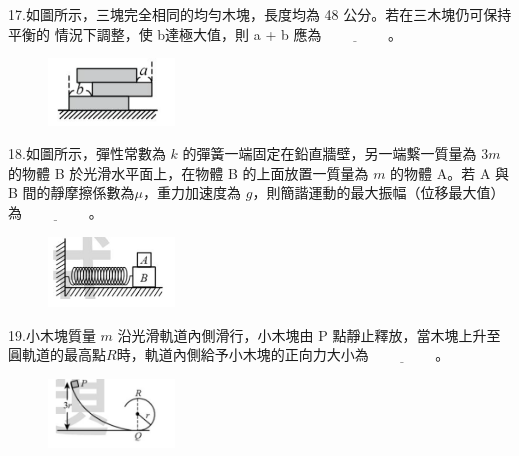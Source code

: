 \documentclass[cn,10pt,math=newtx]{elegantbook}
\begin{document}
\begin{example}
   17.如圖所示，三塊完全相同的均勻木塊，長度均為 48 公分。若在三木塊仍可保持平衡的 情況下調整，使 b達極大值，則 a + b 應為$\underline{\hspace{2cm}}$。\\
    \rightline{[桃園聯招教甄109]}
\end{example}
\begin{solution}
    
\end{solution}
\begin{figure}[htbp]
    \flushright
    \includegraphics[width=0.3\textwidth]{image/109桃聯17.png}
  \end{figure}
\newpage


\begin{example}
   18.如圖所示，彈性常數為 $k$ 的彈簧一端固定在鉛直牆壁，另一端繫一質量為 3$m$ 的物體 B
於光滑水平面上，在物體 B 的上面放置一質量為 $m$ 的物體 A。若 A 與 B 間的靜摩擦係數為$\mu$，重力加速度為 $g$，則簡諧運動的最大振幅（位移最大值）為$\underline{\hspace{2cm}}$。\\
    \rightline{[桃園聯招教甄109]}
\end{example}
\begin{solution}
    
\end{solution}
\begin{figure}[htbp]
    \flushright
    \includegraphics[width=0.3\textwidth]{image/109桃聯18.png}
  \end{figure}
\newpage


\begin{example}
   19.小木塊質量 $m$ 沿光滑軌道內側滑行，小木塊由 P 點靜止釋放，當木塊上升至圓軌道的最高點$R$時，軌道內側給予小木塊的正向力大小為$\underline{\hspace{2cm}}$。\\
    \rightline{[桃園聯招教甄109]}
\end{example}
\begin{solution}
    
\end{solution}
\begin{figure}[htbp]
    \flushright
    \includegraphics[width=0.3\textwidth]{image/109桃聯19.png}
  \end{figure}
\newpage
\end{document}
